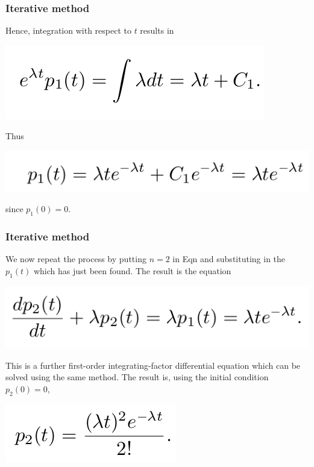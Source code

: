 \documentclass[spanish]{beamer}
\begin{document}
\begin{frame}
\frametitle{Iterative method}

Hence, integration with respect to $t$ results in

\begin{center}
\includegraphics[scale=0.35]{im28}
\end{center}

Thus

\begin{center}
\includegraphics[scale=0.35]{im29}
\end{center}

since $p_{1} (0) = 0.$


\end{frame}
\begin{frame}
\frametitle{Iterative method}

We now repeat the process by putting $n = 2$ in Eqn and
substituting in the $p_{1} (t)$ which has just been found. The result is the equation

\begin{center}
\includegraphics[scale=0.35]{im30}
\end{center}

This is a further first-order integrating-factor differential equation which can be solved
using the same method. The result is, using the initial condition $p_{2} (0) = 0$,

\begin{center}
\includegraphics[scale=0.35]{im31}
\end{center}


\end{frame}
\end{document}
